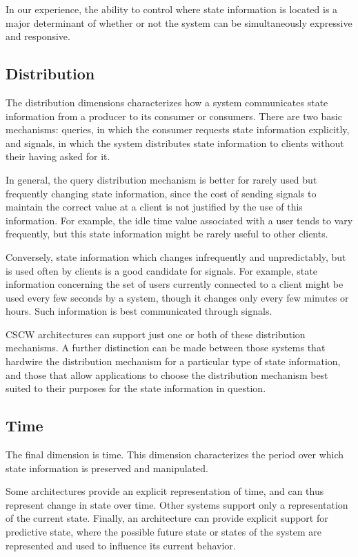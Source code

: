 In our experience, the ability to control where state information
is located is a major determinant of whether or not the system
can be simultaneously expressive and responsive. 

\subsection{Distribution}

The distribution dimensions characterizes how a system communicates state
information from a producer to its consumer or consumers.  There are two
basic mechanisms: queries, in which the consumer requests state information
explicitly, and signals, in which the system distributes state information
to clients without their having asked for it.

In general, the query distribution mechanism is better for 
rarely used but frequently changing state information, since
the cost of sending signals to maintain the correct value 
at a client is not justified by the use of this information.
For example, the idle time value associated with a user
tends to vary frequently, but this state information might
be rarely useful to other clients. 

Conversely, state information which changes infrequently and
unpredictably, but is used often by clients is a good candidate for
signals. For example, state information concerning the set of users
currently connected to a client might be used every few seconds by
a system, though it changes only every few minutes or hours.
Such information is best communicated through signals.

CSCW architectures can support just one or both of these
distribution mechanisms.  A further distinction can be made
between those systems that hardwire the distribution mechanism
for a particular type of state information, and those that
allow applications to choose the distribution mechanism best
suited to their purposes for the state information in question.

\subsection{Time}

The final dimension is time.  This dimension characterizes the period over
which state information is preserved and manipulated.

Some architectures provide an explicit representation of time, and can thus
represent change in state over time. Other systems support only a
representation of the current state.  Finally, an architecture can provide
explicit support for predictive state, where the possible future state or
states of the system are represented and used to influence its current
behavior.


